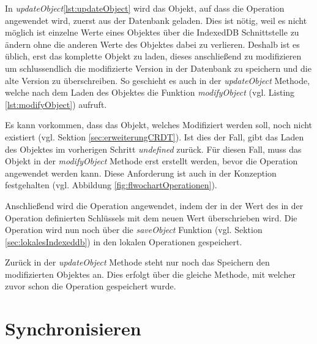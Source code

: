 \documentclass[a4paper, 12pt]{scrreprt}
\begin{document}
\begin{minipage}{\linewidth}
	
\end{minipage}

In \textit{updateObject}\ref{lst:updateObject} wird das Objekt, auf dass die Operation angewendet wird, zuerst aus der Datenbank geladen. Dies ist nötig, weil es nicht möglich ist einzelne Werte eines Objektes über die IndexedDB Schnittstelle zu ändern ohne die anderen Werte des Objektes dabei zu verlieren. Deshalb ist es üblich, erst das komplette Objekt zu laden, dieses anschließend zu modifizieren um schlussendlich die modifizierte Version in der Datenbank zu speichern und die alte Version zu überschreiben. So geschieht es auch in der \textit{updateObject} Methode, welche nach dem Laden des Objektes die Funktion \textit{modifyObject} (vgl. Listing \ref{lst:modifyObject}) aufruft. 

\begin{minipage}{\linewidth}
	
\end{minipage}

Es kann vorkommen, dass das Objekt, welches Modifiziert werden soll, noch nicht existiert (vgl. Sektion \ref{sec:erweiterungCRDT}). Ist dies der Fall, gibt das Laden des Objektes im vorherigen Schritt \textit{undefined} zurück. Für diesen Fall, muss das Objekt in der \textit{modifyObject} Methode erst erstellt werden, bevor die Operation angewendet werden kann. Diese Anforderung ist auch in der Konzeption festgehalten (vgl. Abbildung \ref{fig:flwochartOperationen}).

Anschließend wird die Operation angewendet, indem der in der Wert des in der Operation definierten Schlüssels mit dem neuen Wert überschrieben wird. Die Operation wird nun noch über die \textit{saveObject} Funktion (vgl. Sektion \ref{sec:lokalesIndexeddb}) in den lokalen Operationen gespeichert.

Zurück in der \textit{updateObject} Methode steht nur noch das Speichern den modifizierten Objektes an. Dies erfolgt über die gleiche Methode, mit welcher zuvor schon die Operation gespeichert wurde.

\section{Synchronisieren}
\end{document}

